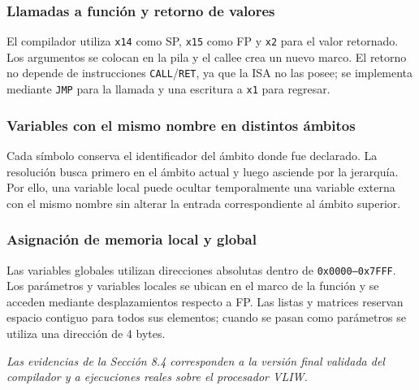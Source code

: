 \documentclass[11pt,letterpaper]{article}
\begin{document}
\subsubsection{Llamadas a función y retorno de valores}

El compilador utiliza \texttt{x14} como SP, \texttt{x15} como FP y \texttt{x2} para el valor retornado. Los argumentos se colocan en la pila y el callee crea un nuevo marco. El retorno no depende de instrucciones \texttt{CALL}/\texttt{RET}, ya que la ISA no las posee; se implementa mediante \texttt{JMP} para la llamada y una escritura a \texttt{x1} para regresar.

\subsubsection{Variables con el mismo nombre en distintos ámbitos}

Cada símbolo conserva el identificador del ámbito donde fue declarado. La resolución busca primero en el ámbito actual y luego asciende por la jerarquía. Por ello, una variable local puede ocultar temporalmente una variable externa con el mismo nombre sin alterar la entrada correspondiente al ámbito superior.

\subsubsection{Asignación de memoria local y global}

Las variables globales utilizan direcciones absolutas dentro de \texttt{0x0000--0x7FFF}. Los parámetros y variables locales se ubican en el marco de la función y se acceden mediante desplazamientos respecto a FP. Las listas y matrices reservan espacio contiguo para todos sus elementos; cuando se pasan como parámetros se utiliza una dirección de 4 bytes.

\vfill
\begin{center}
\small
\textit{Las evidencias de la Sección 8.4 corresponden a la versión final validada del compilador y a ejecuciones reales sobre el procesador VLIW.}
\end{center}
\end{document}
